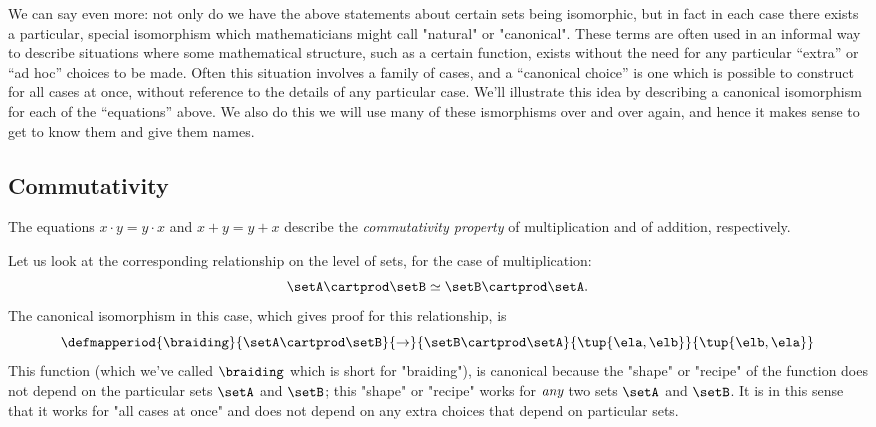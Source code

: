 We can say even more: not only do we have the above statements about certain sets being isomorphic, but in fact in each case there exists a particular, special isomorphism which mathematicians might call "natural" or "canonical". These terms are often used in an informal way to describe situations where some mathematical structure, such as a certain function, exists without the need for any particular ``extra'' or ``ad hoc'' choices to be made. Often this situation involves a family of cases, and a ``canonical choice'' is one which is possible to construct for all cases at once, without reference to the details of any particular case. We'll illustrate this idea by describing a canonical isomorphism for each of the ``equations'' above. We also do this we will use many of these ismorphisms over and over again, and hence it makes sense to get to know them and give them names. 

\subsection{Commutativity}
   
The equations $x \cdot y = y \cdot x$ and $x + y = y + x$ describe the \emph{commutativity property} of multiplication and of addition, respectively. 

Let us look at the corresponding relationship on the level of sets, for the case of multiplication:
\begin{equation}
\setA \cartprod \setB \simeq \setB \cartprod \setA. 
\end{equation}
The canonical isomorphism in this case, which gives proof for this relationship, is
 \begin{equation}
 \defmapperiod{
           \braiding
        }{
            \setA \cartprod \setB
        }{
            \to
        }{
            \setB \cartprod \setA
        }{
            \tup{\ela, \elb}
        }{
            \tup{\elb, \ela}
        }
\end{equation}
This function (which we've called $\braiding$ which is short for "braiding"), is canonical because the "shape" or "recipe" of the function does not depend on the particular sets $\setA$ and $\setB$; this "shape" or "recipe" works for $\emph{any}$ two sets $\setA$ and $\setB$. It is in this sense that it works for "all cases at once" and does not depend on any extra choices that depend on particular sets.

